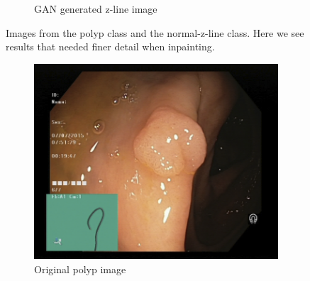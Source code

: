 \begin{figure}[h]
\begin{subfigure}[t]{\myfigsizethree}
            \caption{GAN generated z-line image}    
            \label{fig:z_GAN_SQUARE1}
        \end{subfigure}
        \caption{Images from the polyp class and the normal-z-line class. Here we see results that needed finer detail when inpainting.} 
        \label{fig:AE_GAN_SQUARE1}
\end{figure}  
\begin{figure}[h]
                \tiny
        \begin{subfigure}[t]{\myfigsizethree}
            \centering
            \includegraphics[height=\textwidth ,width=\textwidth]{experiments/figures/greensquare/normalmissORIG.png}
            \caption{Original polyp image}   
            \label{fig:polyp_ORIG_SQUARE2}
        \end{subfigure}
        \qquad
        \begin{subfigure}[t]{\myfigsizethree}
            \centering

\end{subfigure}
\end{figure}
